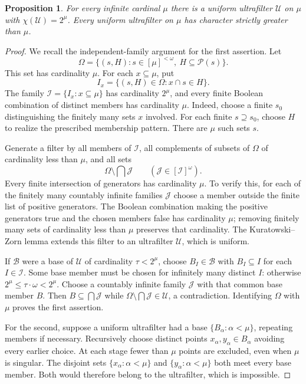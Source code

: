 \documentclass[10pt,a4paper]{amsart}
\newtheorem{proposition}[theorem]{Proposition}
\theoremstyle{definition}
\theoremstyle{remark}
\newcommand{\U}{\mathcal U}
\newcommand{\B}{\mathcal B}
\begin{document}
\begin{proposition}\label{prop:uniform}
For every infinite cardinal $\mu$ there is a uniform ultrafilter $\U$ on $\mu$ with $\chi(\U)=2^\mu$. Every uniform ultrafilter on $\mu$ has character strictly greater than $\mu$.
\end{proposition}
\begin{proof}
We recall the independent-family argument for the first assertion. Let
\[
\Omega=\{(s,H):s\in[\mu]^{<\omega},\ H\subseteq\mathcal P(s)\}.
\]
This set has cardinality $\mu$. For each $x\subseteq\mu$, put
\[
I_x=\{(s,H)\in\Omega:x\cap s\in H\}.
\]
The family $\mathcal I=\{I_x:x\subseteq\mu\}$ has cardinality $2^\mu$, and every finite Boolean combination of distinct members has cardinality $\mu$. Indeed, choose a finite $s_0$ distinguishing the finitely many sets $x$ involved. For each finite $s\supseteq s_0$, choose $H$ to realize the prescribed membership pattern. There are $\mu$ such sets $s$.

Generate a filter by all members of $\mathcal I$, all complements of subsets of $\Omega$ of cardinality less than $\mu$, and all sets
\[
\Omega\setminus\bigcap\mathcal J
\qquad(\mathcal J\in[\mathcal I]^\omega).
\]
Every finite intersection of generators has cardinality $\mu$. To verify this, for each of the finitely many countably infinite families $\mathcal J$ choose a member outside the finite list of positive generators. The Boolean combination making the positive generators true and the chosen members false has cardinality $\mu$; removing finitely many sets of cardinality less than $\mu$ preserves that cardinality. The Kuratowski--Zorn lemma extends this filter to an ultrafilter $\U$, which is uniform.

If $\B$ were a base of $\U$ of cardinality $\tau<2^\mu$, choose $B_I\in\B$ with $B_I\subseteq I$ for each $I\in\mathcal I$. Some base member must be chosen for infinitely many distinct $I$: otherwise $2^\mu\leqslant\tau\cdot\omega<2^\mu$. Choose a countably infinite family $\mathcal J$ with that common base member $B$. Then $B\subseteq\bigcap\mathcal J$ while $\Omega\setminus\bigcap\mathcal J\in\U$, a contradiction. Identifying $\Omega$ with $\mu$ proves the first assertion.

For the second, suppose a uniform ultrafilter had a base $\{B_\alpha:\alpha<\mu\}$, repeating members if necessary. Recursively choose distinct points $x_\alpha,y_\alpha\in B_\alpha$ avoiding every earlier choice. At each stage fewer than $\mu$ points are excluded, even when $\mu$ is singular. The disjoint sets $\{x_\alpha:\alpha<\mu\}$ and $\{y_\alpha:\alpha<\mu\}$ both meet every base member. Both would therefore belong to the ultrafilter, which is impossible.
\end{proof}
\end{document}
